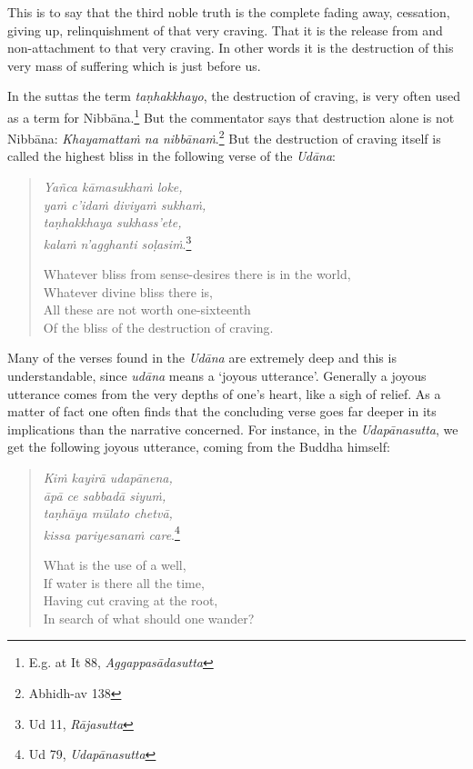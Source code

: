 This is to say that the third noble truth is the complete fading away, cessation, giving up, relinquishment of that very craving. That it is the release from and non-attachment to that very craving. In other words it is the destruction of this very mass of suffering which is just before us.

In the suttas the term \emph{taṇhakkhayo}, the destruction of craving, is very often used as a term for Nibbāna.\footnote{E.g. at It 88, \emph{Aggappasādasutta}} But the commentator says that destruction alone is not Nibbāna: \emph{Khayamattaṁ na nibbānaṁ}.\footnote{Abhidh-av 138} But the destruction of craving itself is called the highest bliss in the following verse of the \emph{Udāna}:

\begin{quote}
\emph{Yañca kāmasukhaṁ loke,}\\
\emph{yaṁ c'idaṁ diviyaṁ sukhaṁ,}\\
\emph{taṇhakkhaya sukhass'ete,}\\
\emph{kalaṁ n'agghanti soḷasiṁ}.\footnote{Ud 11, \emph{Rājasutta}}

Whatever bliss from sense-desires there is in the world,\\
Whatever divine bliss there is,\\
All these are not worth one-sixteenth\\
Of the bliss of the destruction of craving.
\end{quote}

Many of the verses found in the \emph{Udāna} are extremely deep and this is understandable, since \emph{udāna} means a `joyous utterance'. Generally a joyous utterance comes from the very depths of one's heart, like a sigh of relief. As a matter of fact one often finds that the concluding verse goes far deeper in its implications than the narrative concerned. For instance, in the \emph{Udapānasutta}, we get the following joyous utterance, coming from the Buddha himself:

\begin{quote}
\emph{Kiṁ kayirā udapānena,}\\
\emph{āpā ce sabbadā siyuṁ,}\\
\emph{taṇhāya mūlato chetvā,}\\
\emph{kissa pariyesanaṁ care}.\footnote{Ud 79, \emph{Udapānasutta}}

What is the use of a well,\\
If water is there all the time,\\
Having cut craving at the root,\\
In search of what should one wander?
\end{quote}

